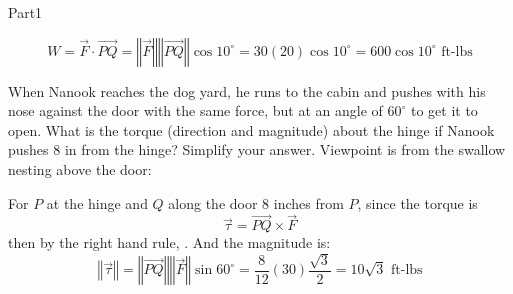 \documentclass{report}
\newcommand{\norm}[1]{\left\Vert #1 \right\Vert}
\newcommand{\vect}[1]{\overrightarrow{#1}}
\begin{document}
\begin{exam}{Part1}
\begin{problem*}[\auto]
\begin{parts}
\begin{solution}[1in]
$$W= \vect{F}\cdot \vect{PQ}=\norm{ \vect{F}}\norm{\vect{PQ}}\cos10^{\circ}=30(20) \cos10^{\circ}=\boxed{600\cos10^{\circ}\text{ ft-lbs}}$$
\end{solution}

\item{} When Nanook reaches the dog yard, he runs to the cabin and pushes with his nose against the door with the same force, but at an angle of $60^\circ$ to get it to open. What is the torque (direction and magnitude) about the hinge if Nanook pushes 8 in from the hinge? Simplify your answer.
\vskip0.3in
Viewpoint is from the swallow nesting above the door:\hspace{2cm}


\begin{solution}[1in] For $P$ at the hinge and $Q$ along the door $8$ inches from $P$, since the torque is
$$\vect{\tau}=\vect{PQ}\times \vect{F} $$
then by the right hand rule, . And the magnitude is:
$$\norm{\vect{\tau}}=\norm{\vect{PQ}}\norm{ \vect{F}}\sin60^{\circ}=\frac{8}{12}(30) \frac{\sqrt{3}}{2}=\boxed{10\sqrt{3}\text{ ft-lbs}} $$
\end{solution}

\end{parts}

\end{problem*}


\end{exam}
\end{document}
